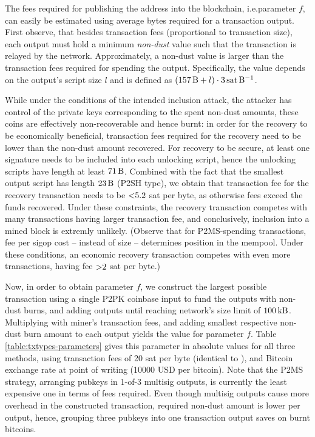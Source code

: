 \documentclass[a4paper,11pt,titlepage]{scrbook}
\begin{document}
The fees required for publishing the address into the blockchain, i.e.\@ parameter $f$, can easily be estimated using average bytes required for a transaction output.
First observe, that besides transaction fees (proportional to transaction size), each output must hold a minimum \emph{non-dust} value such that the transaction is relayed by the network.
Approximately, a non-dust value is larger than the transaction fees required for spending the output.
Specifically, the value depends on the output's script size $l$ and is defined as $(\SI{157}{\byte} + l)\cdot 3\,\text{sat}\,\si{\per\byte}$.

While under the conditions of the intended inclusion attack, the attacker has control of the private keys corresponding to the spent non-dust amounts, these coins are effectively non-recoverable and hence burnt: in order for the recovery to be economically beneficial, transaction fees required for the recovery need to be lower than the non-dust amount recovered.
For recovery to be secure, at least one signature needs to be included into each unlocking script, hence the unlocking scripts have length at least $\SI{71}{\byte}$. Combined with the fact that the smallest output script has length $\SI{23}{\byte}$ (P2SH type), we obtain that transaction fee for the recovery transaction needs to be $\num{<5.2}$ sat per byte, as otherwise fees exceed the funds recovered.
Under these constraints, the recovery transaction competes with many transactions having larger transaction fee, and conclusively, inclusion into a mined block is extremly unlikely.
(Observe that for P2MS-spending transactions, fee per sigop cost – instead of size – determines position in the mempool. Under these conditions, an economic recovery transaction competes with even more transactions, having fee $\num{>2}$ sat per byte.)


Now, in order to obtain parameter $f$, we construct the largest possible transaction  using a single P2PK coinbase input to fund the outputs with non-dust burns, and adding outputs until reaching network's size limit of $\SI{100}{\kilo\byte}$.
Multiplying with miner's transaction fees, and adding smallest respective non-dust burn amount to each output yields the value for parameter $f$.
Table \ref{table:txtypes-parameters} gives this parameter in absolute values for all three methods, using transaction fees of 20 sat per byte (identical to \cite{sward_data_2018}), and Bitcoin exchange rate at point of writing (\num{10000} USD per bitcoin).
Note that the P2MS strategy, arranging pubkeys in 1-of-3 multisig outputs, is currently the least expensive one in terms of fees required.
Even though multisig outputs cause more overhead in the constructed transaction, required non-dust amount is lower per output, hence, grouping three pubkeys into one transaction output saves on burnt bitcoins.
\end{document}
